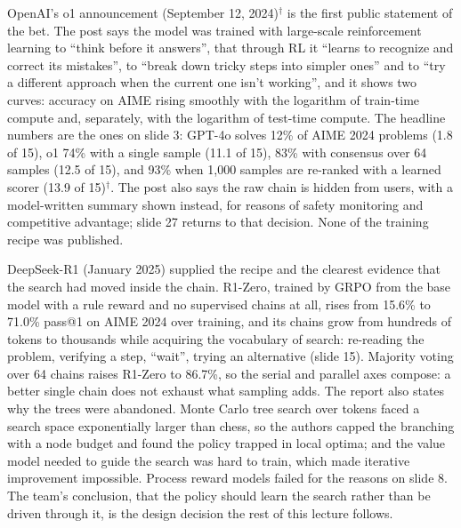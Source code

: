 \documentclass[11pt,letterpaper]{article}
\begin{document}
OpenAI's o1 announcement (September 12, 2024)$^\dagger$ is the first public statement of the bet. The post says the model was trained with large-scale reinforcement learning to ``think before it answers'', that through RL it ``learns to recognize and correct its mistakes'', to ``break down tricky steps into simpler ones'' and to ``try a different approach when the current one isn't working'', and it shows two curves: accuracy on AIME rising smoothly with the logarithm of train-time compute and, separately, with the logarithm of test-time compute. The headline numbers are the ones on slide 3: GPT-4o solves 12\% of AIME 2024 problems (1.8 of 15), o1 74\% with a single sample (11.1 of 15), 83\% with consensus over 64 samples (12.5 of 15), and 93\% when 1,000 samples are re-ranked with a learned scorer (13.9 of 15)$^\dagger$. The post also says the raw chain is hidden from users, with a model-written summary shown instead, for reasons of safety monitoring and competitive advantage; slide 27 returns to that decision. None of the training recipe was published.

DeepSeek-R1 (January 2025) supplied the recipe and the clearest evidence that the search had moved inside the chain. R1-Zero, trained by GRPO from the base model with a rule reward and no supervised chains at all, rises from 15.6\% to 71.0\% pass@1 on AIME 2024 over training, and its chains grow from hundreds of tokens to thousands while acquiring the vocabulary of search: re-reading the problem, verifying a step, ``wait'', trying an alternative (slide 15). Majority voting over 64 chains raises R1-Zero to 86.7\%, so the serial and parallel axes compose: a better single chain does not exhaust what sampling adds. The report also states why the trees were abandoned. Monte Carlo tree search over tokens faced a search space exponentially larger than chess, so the authors capped the branching with a node budget and found the policy trapped in local optima; and the value model needed to guide the search was hard to train, which made iterative improvement impossible. Process reward models failed for the reasons on slide 8. The team's conclusion, that the policy should learn the search rather than be driven through it, is the design decision the rest of this lecture follows.
\end{document}
